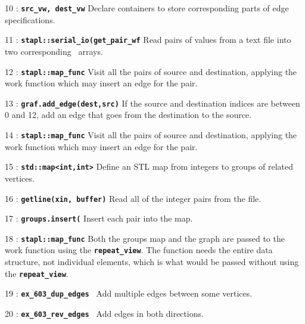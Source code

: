 \documentclass{report}
\begin{document}
\begin{hashitemize}
\item 10 : \texttt{{\bf src\_vw, dest\_vw}}
\newline
Declare containers to store corresponding parts of edge specifications.

\item 11 : \texttt{{\bf stapl::serial\_io(get\_pair\_wf}}
\newline
Read pairs of values from a text file into two corresponding \stapl\ arrays.

\item 12 : \texttt{{\bf stapl::map\_func}}
\newline
Visit all the pairs of source and destination, applying the work function
which may insert an edge for the pair.


\item 13 : \texttt{{\bf graf.add\_edge(dest,src)}}
\newline
If the source and destination indices are between 0 and 12,
add an edge that goes from the destination to the source.

\item 14 : \texttt{{\bf stapl::map\_func}}
\newline
Visit all the pairs of source and destination, applying the work function
which may insert an edge for the pair.


\item 15 : \texttt{{\bf std::map<int,int>}}
\newline
Define an STL map from integers to groups of related vertices.

\item 16 : \texttt{{\bf getline(xin, buffer)}}
\newline
Read all of the integer pairs from the file.

\item 17 : \texttt{{\bf groups.insert(}}
\newline
Insert each pair into the map.

\item 18 : \texttt{{\bf stapl::map\_func}}
\newline
Both the groups map and the graph are passed to the work function using
the \texttt{{\bf repeat\_view}}.  The function needs the entire data
structure, not individual elements, which is what would be passed
without using the \texttt{{\bf repeat\_view}}.


\item 19 : \texttt{{\bf ex\_603\_dup\_edges }}
\newline
Add multiple edges between some vertices.

\item 20 : \texttt{{\bf ex\_603\_rev\_edges }}
\newline
Add edges in both directions.

\end{hashitemize}
\end{document}
